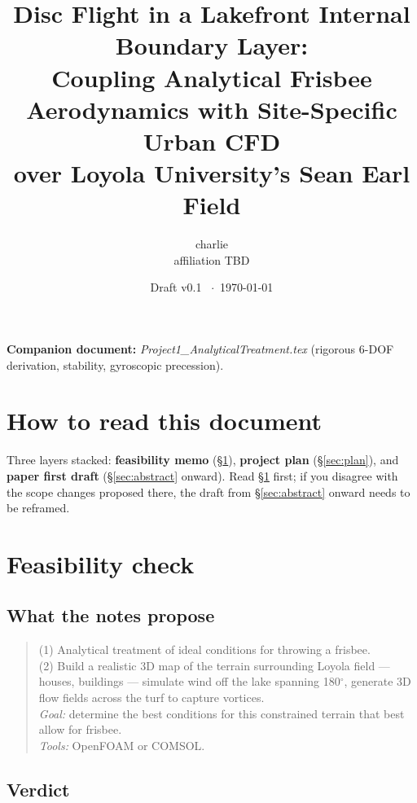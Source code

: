 \documentclass[11pt,letterpaper]{article}
\title{\bfseries Disc Flight in a Lakefront Internal Boundary Layer:\\Coupling Analytical Frisbee Aerodynamics with Site-Specific Urban CFD\\over Loyola University's Sean Earl Field}
\author{charlie\\\small affiliation TBD}
\date{Draft v0.1 \ $\cdot$\ \today}
\begin{document}
\maketitle

\noindent\textbf{Companion document:} \emph{Project1\_AnalyticalTreatment.tex} (rigorous 6-DOF derivation, stability, gyroscopic precession).

\section*{How to read this document}

Three layers stacked: \textbf{feasibility memo} (\S\ref{sec:feas}), \textbf{project plan} (\S\ref{sec:plan}), and \textbf{paper first draft} (\S\ref{sec:abstract} onward). Read \S\ref{sec:feas} first; if you disagree with the scope changes proposed there, the draft from \S\ref{sec:abstract} onward needs to be reframed.

\section{Feasibility check}
\label{sec:feas}

\subsection{What the notes propose}

\begin{quote}
(1) Analytical treatment of ideal conditions for throwing a frisbee.\\
(2) Build a realistic 3D map of the terrain surrounding Loyola field --- houses, buildings --- simulate wind off the lake spanning 180$^\circ$, generate 3D flow fields across the turf to capture vortices.\\
\emph{Goal:} determine the best conditions for this constrained terrain that best allow for frisbee.\\
\emph{Tools:} OpenFOAM or COMSOL.
\end{quote}

\subsection{Verdict}
\end{document}
